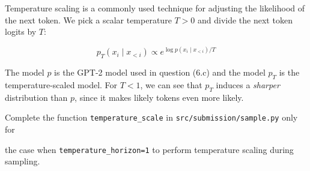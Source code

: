 \item {}

Temperature scaling is a commonly used technique for adjusting the likelihood of the next token. We pick a scalar temperature
$T > 0$ and divide the next token logits by $T$:

\begin{equation} \label{eq:14}
    p_{T}(x_i \mid x_{<i}) \propto e^{\log p(x_i \mid x_{<i})/T}
\end{equation}


The model $p$ is the GPT-2 model used in question (6.c) and the model $p_T$ is the temperature-scaled model. For $T < 1$, 
we can see that $p_T$ induces a \textit{sharper} distribution than $p$, since it makes likely tokens even more likely.

Complete the function \texttt{temperature\_scale} in \texttt{src/submission/sample.py} only for 

the case when \texttt{temperature\_horizon=1} 
to perform temperature scaling during sampling.